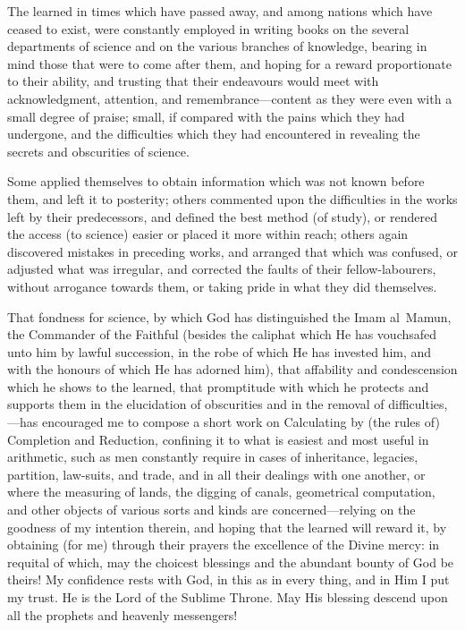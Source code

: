 The learned in times which have passed away, and among nations which have ceased to exist, were constantly employed in writing books on the several departments of science and on the various branches of knowledge, bearing in mind those that were to come after them, and hoping for a reward proportionate to their ability, and trusting that their endeavours would meet with acknowledgment, attention, and remembrance---content as they were even with a small degree of praise; small, if compared with the pains which they had undergone, and the difficulties which they had encountered in revealing the secrets and obscurities of science.

Some applied themselves to obtain information which was not known before them, and left it to posterity; others commented upon the difficulties in the works left by their predecessors, and defined the best method (of study), or rendered the access (to science) easier or placed it more within reach; others again discovered mistakes in preceding works, and arranged that which was confused, or adjusted what was irregular, and corrected the faults of their fellow-labourers, without arrogance towards them, or taking pride in what they did themselves.

That fondness for science, by which God has distinguished the Imam al~Mamun, the Commander of the Faithful (besides the caliphat which He has vouchsafed unto him by lawful succession, in the robe of which He has invested him, and with the honours of which He has adorned him), that affability and condescension which he shows to the learned, that promptitude with which he protects and supports them in the elucidation of obscurities and in the removal of difficulties,---has encouraged me to compose a short work on Calculating by (the rules of) Completion and Reduction, confining it to what is easiest and most useful in arithmetic, such as men constantly require in cases of inheritance, legacies, partition, law-suits, and trade, and in all their dealings with one another, or where the measuring of lands, the digging of canals, geometrical computation, and other objects of various sorts and kinds are concerned---relying on the goodness of my intention therein, and hoping that the learned will reward it, by obtaining (for me) through their prayers the excellence of the Divine mercy: in requital of which, may the choicest blessings and the abundant bounty of God be theirs! My confidence rests with God, in this as in every thing, and in Him I put my trust. He is the Lord of the Sublime Throne. May His blessing descend upon all the prophets and heavenly messengers!

